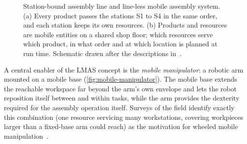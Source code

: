 \begin{figure}[htbp]
  \caption[Station-bound assembly line and line-less mobile assembly
    system]{%
    Station-bound assembly line and line-less mobile assembly system.
    (a) Every product passes the stations S1 to S4 in the same order,
    and each station keeps its own resources. (b) Products and resources
    are mobile entities on a shared shop floor; which resources serve
    which product, in what order and at which location is planned at run
    time. Schematic drawn after the descriptions
    in~\cite{Huettemann2016LMAS,Huettemann2019LMAS,Buckhorst2019Planning}.}
  \label{fig:line-vs-lmas}
\end{figure}

A central enabler of the LMAS concept is the \emph{mobile manipulator}:
a robotic arm mounted on a mobile base
(\cref{fig:mobile-manipulator}). The mobile base extends the reachable
workspace far beyond the arm's own envelope and lets the robot
reposition itself between and within tasks, while the arm provides the
dexterity required for the assembly operation itself. Surveys of the
field identify exactly this combination (one resource servicing many
workstations, covering workpieces larger than a fixed-base arm could
reach) as the motivation for wheeled mobile
manipulation~\cite{Sandakalum2022Survey,Thakar2023MobileManip}.

